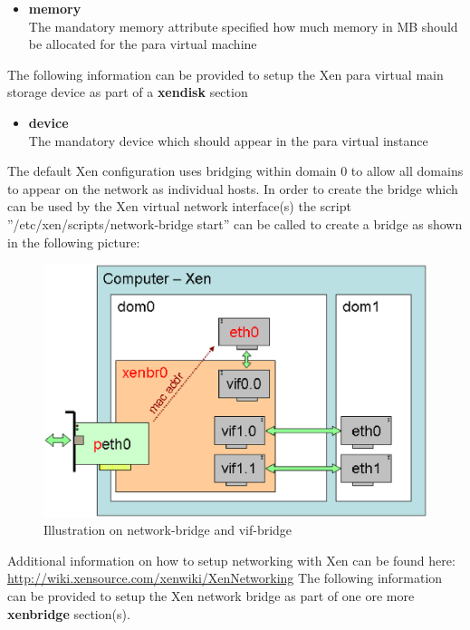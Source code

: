 \begin{itemize}
\item \textbf{memory}\\
      The mandatory memory attribute specified how much memory in MB
      should be allocated for the para virtual machine    
\end{itemize}

The following information can be provided to setup the Xen para virtual
main storage device as part of a \textbf{xendisk} section

\begin{itemize}
\item \textbf{device}\\
      The mandatory device which should appear in the para virtual
      instance
\end{itemize}

The default Xen configuration uses bridging within domain 0 to allow all
domains to appear on the network as individual hosts. In order to create
the bridge which can be used by the Xen virtual network interface(s) the
script ''/etc/xen/scripts/network-bridge start'' can be called to create
a bridge as shown in the following picture:

\begin{figure}[h]
\centering
\includegraphics[scale=0.5]{pictures/xenbridge.eps}
\caption{Illustration on network-bridge and vif-bridge}
\label{fig:architecture}
\end{figure}

Additional information on how to setup networking with Xen can be
found here: \url{http://wiki.xensource.com/xenwiki/XenNetworking}
The following information can be provided to setup the Xen network
bridge as part of one ore more \textbf{xenbridge} section(s).

